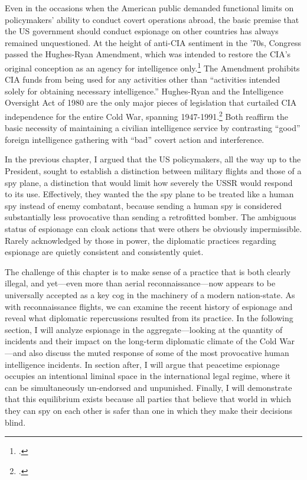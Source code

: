 \documentclass{memoir}
\begin{document}
\begin{refsegment}
Even in the occasions when the American public demanded functional limits on policymakers' ability to conduct covert operations abroad, the basic premise that the US government should conduct espionage on other countries has always remained unquestioned. At the height of anti-CIA sentiment in the '70s, Congress passed the Hughes-Ryan Amendment, which was intended to restore the CIA's original conception as an agency for intelligence only.\footcite[p.~215]{andrew_missing_1984} The Amendment prohibits CIA funds from being used for any activities other than ``activities intended solely for obtaining necessary intelligence.'' Hughes-Ryan and the Intelligence Oversight Act of 1980 are the only major pieces of legislation that curtailed CIA independence for the entire Cold War, spanning 1947-1991.\footcite[p.~93-94]{cogan_covert_1993} Both reaffirm the basic necessity of maintaining a civilian intelligence service by contrasting ``good'' foreign intelligence gathering with ``bad'' covert action and interference.

In the previous chapter, I argued that the US policymakers, all the way up to the President, sought to establish a distinction between military flights and those of a spy plane, a distinction that would limit how severely the USSR would respond to its use. Effectively, they wanted the the spy plane to be treated like a human spy instead of enemy combatant, because sending a human spy is considered substantially less provocative than sending a retrofitted bomber. The ambiguous status of espionage can cloak actions that were others be obviously impermissible. Rarely acknowledged by those in power, the diplomatic practices regarding espionage are quietly consistent and consistently quiet.

The challenge of this chapter is to make sense of a practice that is both clearly illegal, and yet---even more than aerial reconnaissance---now appears to be universally accepted as a key cog in the machinery of a modern nation-state. As with reconnaissance flights, we can examine the recent history of espionage and reveal what diplomatic repercussions resulted from its practice. In the following section, I will analyze espionage in the aggregate---looking at the quantity of incidents and their impact on the long-term diplomatic climate of the Cold War---and also discuss the muted response of some of the most provocative human intelligence incidents. In section after, I will argue that peacetime espionage occupies an intentional liminal space in the international legal regime, where it can be simultaneously un-endorsed and unpunished. Finally, I will demonstrate that this equilibrium exists because all parties that believe that world in which they can spy on each other is safer than one in which they make their decisions blind.

\end{refsegment}
\end{document}
